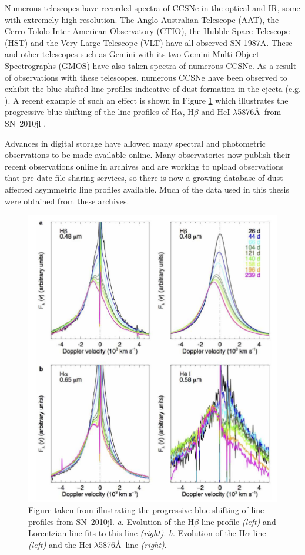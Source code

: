 Numerous telescopes have recorded spectra of CCSNe in the optical and IR, some with extremely high resolution.  The Anglo-Australian Telescope (AAT), the Cerro Tololo Inter-American Observatory (CTIO), the Hubble Space Telescope (HST) and the Very Large Telescope (VLT) have all observed SN 1987A.  These and other telescopes such as Gemini with its two Gemini Multi-Object Spectrographs (GMOS) have also taken spectra of numerous CCSNe.  As a result of observations with these telescopes, numerous CCSNe have been observed to exhibit the blue-shifted line profiles indicative of dust formation in the ejecta (e.g. \citet{Lucy1989,Fabbri2011,Mauerhan2012,Milisavljevic2012}).  A recent example of such an effect is shown in Figure \ref{fig:2010jl} which illustrates the progressive blue-shifting of the line profiles of H$\alpha$, H$\beta$ and  HeI $\lambda$5876\AA\ from SN~2010jl \citep{Gall2014}.

Advances in digital storage have allowed many spectral and photometric observations to be made  available online.  Many observatories now publish their recent observations online in archives and are working to upload observations that pre-date file sharing services, so there is now a growing database of dust-affected asymmetric line profiles  available. Much of the data used in this thesis were obtained from these archives.
\begin{figure}[!t]
\centering
\includegraphics[clip=true,scale=0.4,trim= 0 -20 0 -20]{chapters/chapter1/figs/2010jl.png}
\caption{Figure taken from \citet{Gall2014} illustrating the progressive blue-shifting of line profiles from SN~2010jl.  {\em a.} Evolution of the H$\beta$ line profile {\em (left)} and Lorentzian line fits to this line {\em (right)}. {\em b.} Evolution of the H$\alpha$ line {\em (left)} and the He{\sc i} $\lambda$5876\AA\ line {\em (right)}.}
\label{fig:2010jl}
\end{figure}


